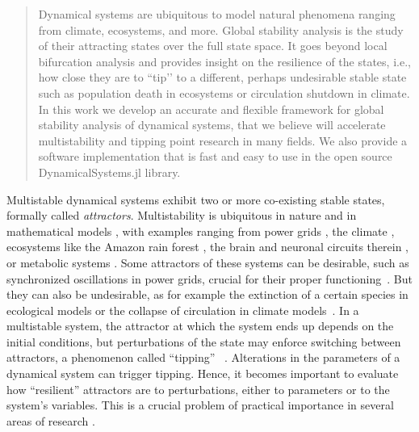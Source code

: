 \documentclass[%
 aip,
 amsmath,amssymb,
 reprint,%
]{revtex4-1}
\begin{document}
\begin{quotation}
Dynamical systems are ubiquitous to model natural phenomena ranging from climate, ecosystems, and more. Global stability analysis is the study of their attracting states over the full state space. It goes beyond local bifurcation analysis and provides insight on the resilience of the states, i.e., how close they are to ``tip’’ to a different, perhaps undesirable stable state such as population death in ecosystems or circulation shutdown in climate. In this work we develop an accurate and flexible framework for global stability analysis of dynamical systems, that we believe will accelerate multistability and tipping point research in many fields. We also provide a software implementation that is fast and easy to use in the open source DynamicalSystems.jl library.
\end{quotation}



Multistable dynamical systems exhibit two or more co-existing stable states, formally called \emph{attractors}. Multistability is ubiquitous in nature and in mathematical models \cite{feudel2018multistability, Pisarchik2022}, with examples ranging from power grids \cite{hellmann2020network, kim2018multistability, halekotte2021transient}, the climate \cite{marotzke2016instability, lenton2013environmental}, ecosystems like the Amazon rain forest \cite{hirota2011global, dakos2019ecosystem}, the brain and neuronal circuits therein \cite{schwartz2012multistability, kelso2012multistability, kleinschmidt2012variability}, or metabolic systems \cite{zhu2022synthetic, khazaei2022metabolic, geiss2022multistability}. Some attractors of these systems can be desirable, such as synchronized oscillations in power grids, crucial for their proper functioning~\cite{padiyar1999power}. But they can also be undesirable, as for example the extinction of a certain species in ecological models or the collapse of circulation in climate models~\cite{Lohmann2021-wh}. 
In a multistable system, the attractor at which the system ends up depends on the initial conditions, but perturbations of the state may enforce switching between attractors, a phenomenon called ``tipping'' ~\cite{Ashwin2012, feudel2018multistability, dakos2019ecosystem}. Alterations in the parameters of a dynamical system can trigger tipping. Hence, it becomes important to evaluate how ``resilient'' attractors are to perturbations, either to parameters or to the system's variables. This is a crucial problem of practical importance in several areas of research \cite{dakos2019ecosystem, halekotte2020minimal}.
\end{document}
